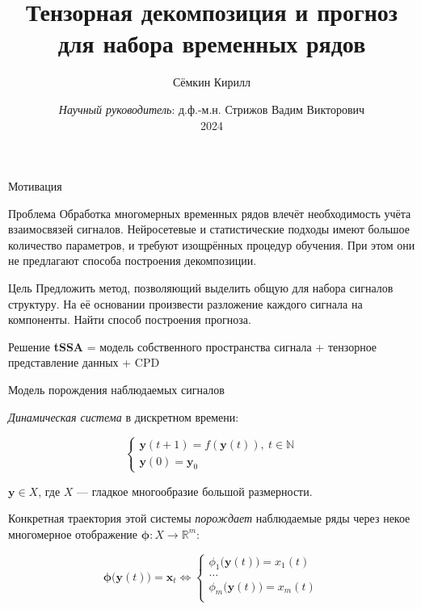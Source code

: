 \documentclass[10pt]{beamer}
\title{Тензорная декомпозиция и прогноз для набора временных рядов}
\author{Сёмкин Кирилл}
\institute[MIPT]{Московский физико-технический институт \\ Кафедра интеллектуальных систем}
\date[2024]{\textit{Научный руководитель}: д.ф.-м.н. Стрижов Вадим Викторович \\ 2024}
\theoremstyle{definition}
\begin{document}
	
	\begin{frame}[c]
		\titlepage
	\end{frame}

	\begin{frame}{Мотивация}
		
		\begin{alertblock}{Проблема}
			Обработка многомерных временных рядов влечёт необходимость учёта взаимосвязей сигналов. Нейросетевые и статистические подходы имеют большое количество параметров, и требуют изощрённых процедур обучения. При этом они не предлагают способа построения декомпозиции.
		\end{alertblock}
		
		\begin{block}{Цель}
			Предложить метод, позволяющий выделить общую для набора сигналов структуру. На её основании произвести разложение каждого сигнала на компоненты. Найти способ построения прогноза.
		\end{block}
		
		\begin{exampleblock}{Решение}
			\textbf{tSSA} = модель собственного пространства сигнала + тензорное представление данных + CPD
		\end{exampleblock}
		
	\end{frame}	
	
	\begin{frame}{Модель порождения наблюдаемых сигналов}
		
		\emph{Динамическая система} в дискретном времени:
		
		\begin{equation*}
			\begin{cases}
				\textbf{y}(t + 1) = f(\textbf{y}(t)), \ t \in \mathbb{N} \\
				\textbf{y}(0) = \textbf{y}_0
			\end{cases}
		\end{equation*}
		
		$ \textbf{y} \in X $, где $ X $ --- гладкое многообразие большой размерности. 
		
		Конкретная траектория этой системы \emph{порождает} наблюдаемые ряды через некое многомерное отображение $ \boldsymbol{\phi}: X \to \mathbb{R}^m $:
		
		\begin{equation*}
			\boldsymbol{\phi}\bigl(\textbf{y}(t)\bigl) = \textbf{x}_t \Leftrightarrow \begin{cases}
				\phi_1\bigl(\textbf{y}(t)\bigl) = x_1(t) \\
				\ldots \\
				\phi_m\bigl(\textbf{y}(t)\bigl) = x_m(t) \\
			\end{cases}
		\end{equation*}
		
	\end{frame}
	
\end{document}
